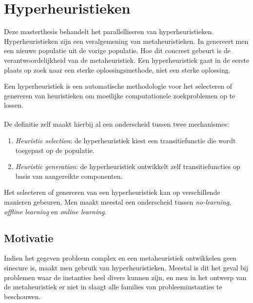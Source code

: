 \section{Hyperheuristieken}

Deze masterthesis behandelt het parallelliseren van hyperheuristieken. Hyperheuristieken zijn een veralgemening van metaheuristieken. In  genereert men een nieuwe populatie uit de vorige populatie. Hoe dit concreet gebeurt is de verantwoordelijkheid van de metaheuristiek. Een hyperheuristiek gaat in de eerste plaats op zoek naar een sterke oplossingsmethode, niet een sterke oplossing.\cite{Burke03hyper-heuristics:an,Kendall01ahyperheuristic,Burke_aclassification}

\begin{definition}
Een hyperheuristiek is een automatische methodologie voor het selecteren of genereren van heuristieken om moeilijke computationele zoekproblemen op te lossen.
\end{definition}


\paragraph{}
De definitie zelf maakt hierbij al een onderscheid tussen twee mechanismes\cite{Burke_aclassification}:
\begin{enumerate}
 \item \emph{Heuristic selection}: de hyperheuristiek kiest een transitiefunctie die wordt toegepast op de populatie.
 \item \emph{Heuristic generation}: de hyperheuristiek ontwikkelt zelf transitiefuncties op basis van aangereikte componenten.
\end{enumerate}

Het selecteren of genereren van een hyperheuristiek kan op verschillende manieren gebeuren. Men maakt meestal een onderscheid tussen \emph{no-learning}, \emph{offline learning} en \emph{online learning}.

\subsection{Motivatie}
Indien het gegeven probleem complex en een metaheuristiek ontwikkelen geen sinecure is, maakt men gebruik van hyperheuristieken. Meestal is dit het geval bij problemen waar de instanties heel divers kunnen zijn, en men in het ontwerp van de metaheuristiek er niet in slaagt alle families van probleeminstanties te beschouwen.

